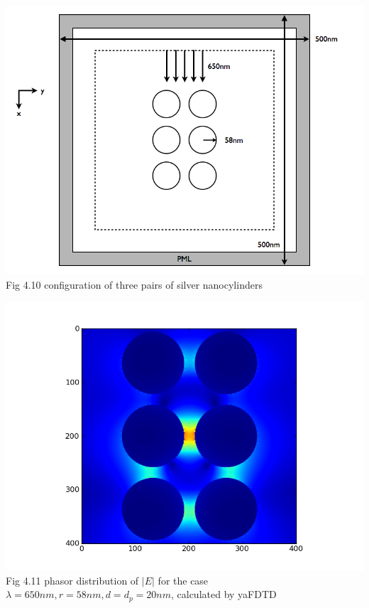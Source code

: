 \documentclass[openany]{book}
\begin{document}
\begin{center}
\includegraphics[scale=0.5]{images/open-cavity-config-r58.png}\\
Fig 4.10
configuration of three pairs of silver nanocylinders
\end{center}

\begin{center}
\includegraphics[scale=0.8]{images/etotal-r58.png}\\
Fig 4.11
phasor distribution of $|E|$ for the case $\lambda = 650nm, r = 58nm, d = d_p = 20nm$, calculated by yaFDTD
\end{center}
\end{document}
